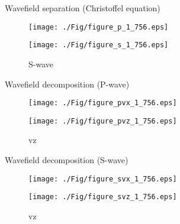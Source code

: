 \documentclass[aspectratio=43]{beamer}
\begin{document}
\begin{frame}{Wavefield separation (Christoffel equation)}
   \begin{figure}[ht]
        \begin{minipage}[b]{0.45\linewidth}
            \centering
            \texttt{[image: ./Fig/figure\_p\_1\_756.eps]}
            \caption{P-wave}
        \end{minipage}
        \hspace{0.5cm}
        \begin{minipage}[b]{0.45\linewidth}
            \centering
            \texttt{[image: ./Fig/figure\_s\_1\_756.eps]}
            \caption{S-wave}
        \end{minipage}
    \end{figure}
\end{frame}
\begin{frame}{Wavefield decomposition (P-wave)}
   \begin{figure}[ht]
        \begin{minipage}[b]{0.45\linewidth}
            \centering
            \texttt{[image: ./Fig/figure\_pvx\_1\_756.eps]}
            \caption{vx}
        \end{minipage}
        \hspace{0.5cm}
        \begin{minipage}[b]{0.45\linewidth}
            \centering
            \texttt{[image: ./Fig/figure\_pvz\_1\_756.eps]}
            \caption{vz}
        \end{minipage}
    \end{figure}

\end{frame}
\begin{frame}{Wavefield decomposition (S-wave)}
   \begin{figure}[ht]
        \begin{minipage}[b]{0.45\linewidth}
            \centering
  	    \texttt{[image: ./Fig/figure\_svx\_1\_756.eps]}
            \caption{vx}
        \end{minipage}
        \hspace{0.5cm}
        \begin{minipage}[b]{0.45\linewidth}
            \centering
            \texttt{[image: ./Fig/figure\_svz\_1\_756.eps]}
            \caption{vz}
        \end{minipage}
    \end{figure}
\end{frame}
\end{document}
